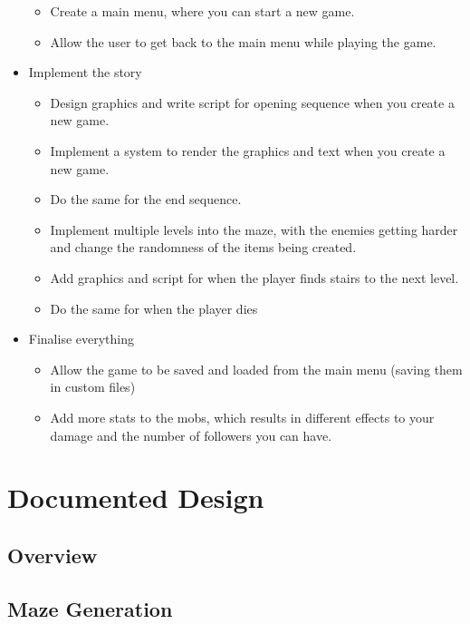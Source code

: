 \documentclass{article}
\begin{document}
\begin{itemize}
\begin{itemize}
                        \item Create a main menu, where you can start a new game.
                        \item Allow the user to get back to the main menu while playing the game.
                    \end{itemize}
                \item Implement the story
                    \begin{itemize}
                        \item Design graphics and write script for opening sequence when you create a new game.
                        \item Implement a system to render the graphics and text when you create a new game.
                        \item Do the same for the end sequence.
                        \item Implement multiple levels into the maze, with the enemies getting harder and change the randomness of the items being created.
                        \item Add graphics and script for when the player finds stairs to the next level.
                        \item Do the same for when the player dies
                    \end{itemize}
                \item Finalise everything
                    \begin{itemize}
                        \item Allow the game to be saved and loaded from the main menu (saving them in custom files)
                        \item Add more stats to the mobs, which results in different effects to your damage and the number of followers you can have.
                    \end{itemize}
            \end{itemize}
    \clearpage
    \section{Documented Design}
        \subsection{Overview}
        \subsection{Maze Generation}
\end{document}
